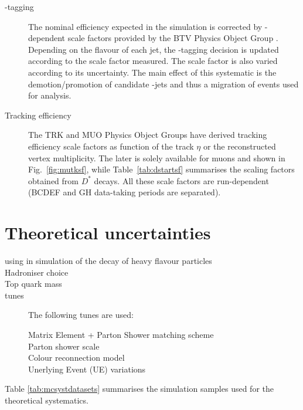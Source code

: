 \begin{description}
\item[\cPqb-tagging] The nominal efficiency expected in the simulation is corrected by \pt-dependent scale factors provided by the BTV Physics Object Group \cite{twiki:BTV}. Depending on the flavour of each jet, the \cPqb-tagging decision is updated according to the scale factor measured. The scale factor is also varied according to its uncertainty. The main effect of this systematic is the demotion/promotion of candidate \cPqb-jets and thus a migration of events used for analysis.

\item[Tracking efficiency]
The TRK and MUO Physics Object Groups have derived tracking efficiency scale factors as function of the track $\eta$ or the reconstructed vertex multiplicity. The later is solely available for muons and shown in Fig.~\ref{fig:mutksf}, while Table~\ref{tab:dstartsf} summarises the scaling factors obtained from $D^*$ decays. All these scale factors are run-dependent (BCDEF and GH data-taking periods are separated).
\end{description}
\clearpage
\section{Theoretical uncertainties}
\begin{description}
\item[using \EVTGEN in simulation of the decay of heavy flavour particles]
  
\item[Hadroniser choice] 

\item[Top quark mass] 

\item[\PYTHIA tunes] The following \PYTHIA tunes are used:
  
  \begin{description}
    
  \item[Matrix Element + Parton Shower matching scheme] 
  \item[Parton shower scale] 
  \item[Colour reconnection model] 
  \item[Unerlying Event (UE) variations] 
  \end{description}
\end{description}

Table \ref{tab:mcsystdatasets} summarises the simulation samples used for the theoretical systematics.


